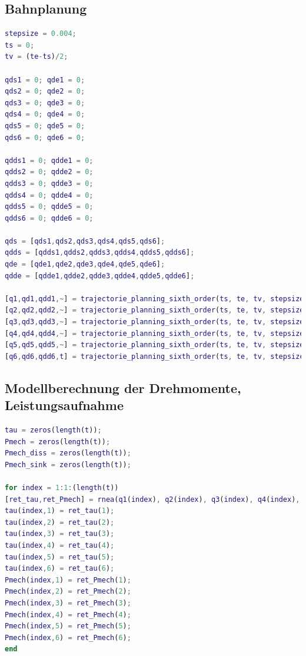 \subsection{Bahnplanung}
%
\begin{lstlisting}[language=Matlab, numbers=none]
stepsize = 0.004;
ts = 0;
tv = (te-ts)/2;

qds1 = 0; qde1 = 0;
qds2 = 0; qde2 = 0;
qds3 = 0; qde3 = 0;
qds4 = 0; qde4 = 0;
qds5 = 0; qde5 = 0;
qds6 = 0; qde6 = 0;

qdds1 = 0; qdde1 = 0;
qdds2 = 0; qdde2 = 0;
qdds3 = 0; qdde3 = 0;
qdds4 = 0; qdde4 = 0;
qdds5 = 0; qdde5 = 0;
qdds6 = 0; qdde6 = 0;

qds = [qds1,qds2,qds3,qds4,qds5,qds6];
qdds = [qdds1,qdds2,qdds3,qdds4,qdds5,qdds6];
qde = [qde1,qde2,qde3,qde4,qde5,qde6];
qdde = [qdde1,qdde2,qdde3,qdde4,qdde5,qdde6];

[q1,qd1,qdd1,~] = trajectorie_planning_sixth_order(ts, te, tv, stepsize, qs(1), qds(1), qdds(1), qv(1), qe(1), qde(1), qdde(1));
[q2,qd2,qdd2,~] = trajectorie_planning_sixth_order(ts, te, tv, stepsize, qs(2), qds(2), qdds(2), qv(2), qe(2), qde(2), qdde(2));
[q3,qd3,qdd3,~] = trajectorie_planning_sixth_order(ts, te, tv, stepsize, qs(3), qds(3), qdds(3), qv(3), qe(3), qde(3), qdde(3));
[q4,qd4,qdd4,~] = trajectorie_planning_sixth_order(ts, te, tv, stepsize, qs(4), qds(4), qdds(4), qv(4), qe(4), qde(4), qdde(4));
[q5,qd5,qdd5,~] = trajectorie_planning_sixth_order(ts, te, tv, stepsize, qs(5), qds(5), qdds(5), qv(5), qe(5), qde(5), qdde(5));
[q6,qd6,qdd6,t] = trajectorie_planning_sixth_order(ts, te, tv, stepsize, qs(6), qds(6), qdds(6), qv(6), qe(6), qde(6), qdde(6));
\end{lstlisting}
%
\subsection{Modellberechnung der Drehmomente, Leistungsaufnahme}
%
\begin{lstlisting}[language=Matlab, numbers=none]
% Initialisierung
tau = zeros(length(t));
Pmech = zeros(length(t));
Pmech_diss = zeros(length(t));
Pmech_sink = zeros(length(t));

for index = 1:1:(length(t))
[ret_tau,ret_Pmech] = rnea(q1(index), q2(index), q3(index), q4(index), q5(index), q6(index), qd1(index), qd2(index), qd3(index), qd4(index), qd5(index), qd6(index), qdd1(index), qdd2(index), qdd3(index), qdd4(index), qdd5(index), qdd6(index));
tau(index,1) = ret_tau(1);
tau(index,2) = ret_tau(2);
tau(index,3) = ret_tau(3);
tau(index,4) = ret_tau(4);
tau(index,5) = ret_tau(5);
tau(index,6) = ret_tau(6);
Pmech(index,1) = ret_Pmech(1);
Pmech(index,2) = ret_Pmech(2);
Pmech(index,3) = ret_Pmech(3);
Pmech(index,4) = ret_Pmech(4);
Pmech(index,5) = ret_Pmech(5);
Pmech(index,6) = ret_Pmech(6);
end
\end{lstlisting}
%
